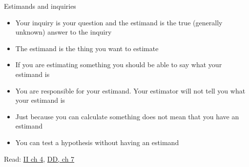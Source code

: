 \documentclass[
  11pt,
  ignorenonframetext,
]{beamer}
\providecommand{\tightlist}{%
  \setlength{\itemsep}{0pt}\setlength{\parskip}{0pt}}\usepackage{longtable,booktabs,array}
\begin{document}
\begin{frame}{Estimands and inquiries}
\begin{itemize}
\tightlist
\item
  Your inquiry is your question and the estimand is the true (generally
  unknown) answer to the inquiry
\item
  The estimand is the thing you want to estimate
\item
  If you are estimating something you should be able to say what your
  estimand is
\item
  You are responsible for your estimand. Your estimator will not tell
  you what your estimand is
\item
  Just because you can calculate something does not mean that you have
  an estimand
\item
  You can test a hypothesis without having an estimand
\end{itemize}

Read:
\href{https://macartan.github.io/integrated_inferences/HJC4.html}{II ch
4},
\href{https://book.declaredesign.org/declaration-diagnosis-redesign/defining-inquiry.html}{DD,
ch 7}
\end{frame}
\end{document}
